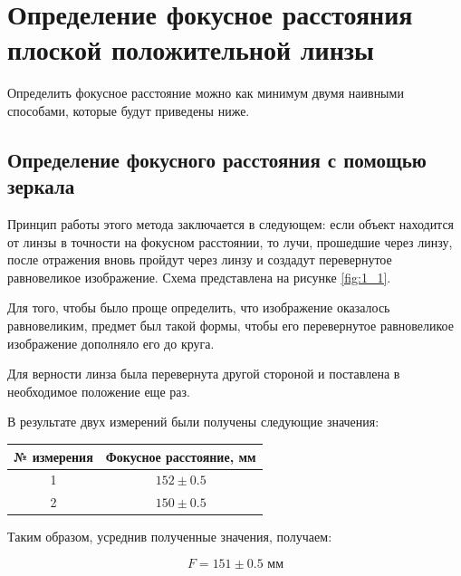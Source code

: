 \documentclass[a4paper, 12pt]{article}
\begin{document}
\section{Определение фокусное расстояния плоской положительной линзы}

Определить фокусное расстояние можно как минимум двумя наивными способами, которые будут приведены ниже.

\subsection{Определение фокусного расстояния с помощью зеркала}

Принцип работы этого метода заключается в следующем: если объект находится от линзы в точности на фокусном расстоянии, то лучи, прошедшие через линзу, после отражения вновь пройдут через линзу и создадут перевернутое равновеликое изображение. Схема представлена на рисунке \ref{fig:1_1}.

Для того, чтобы было проще определить, что изображение оказалось равновеликим, предмет был такой формы, чтобы его перевернутое равновеликое изображение дополняло его до круга.

Для верности линза была перевернута другой стороной и поставлена в необходимое положение еще раз.

В результате двух измерений были получены следующие значения:

\begin{center}
	\begin{tabular}[H]{|c|c|}
		\hline
		№ измерения & Фокусное расстояние, мм \\
		\hline
		1 & $152 \pm 0.5$ \\
		\hline
		2 & $150 \pm 0.5$ \\
		\hline
	\end{tabular}
\end{center}

Таким образом, усреднив полученные значения, получаем:

\begin{equation*}
	\boxed{F = 151 \pm 0.5 \text{ мм}}
\end{equation*}
\end{document}
